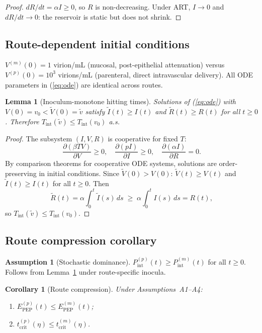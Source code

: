 \documentclass[11pt]{article}
\newtheorem{lemma}{Lemma}[section]
\newtheorem{corollary}{Corollary}[section]
\theoremstyle{definition}
\newtheorem{assumption}{Assumption}[section]
\theoremstyle{remark}
\newcommand{\Tint}{T_{\text{int}}}
\newcommand{\Pint}{P_{\text{int}}}
\newcommand{\Epep}{E_{\text{PEP}}}
\newcommand{\tcrit}{t_{\text{crit}}}
\begin{document}
\begin{proof}
$dR/dt = \alpha I \geq 0$, so $R$ is non-decreasing. Under ART, $I \to 0$ and $dR/dt \to 0$: the reservoir is static but does not shrink.
\end{proof}

\subsection{Route-dependent initial conditions}

$V^{(m)}(0) = 1$ virion/mL (mucosal, post-epithelial attenuation) versus $V^{(p)}(0) = 10^{3}$ virions/mL (parenteral, direct intravascular delivery). All ODE parameters in (\ref{eq:ode}) are identical across routes.

\begin{lemma}[Inoculum-monotone hitting times]\label{lem:monotone}
Solutions of (\ref{eq:ode}) with $V(0) = v_{0} < \tilde{V}(0) = \tilde{v}$ satisfy $\tilde{I}(t) \geq I(t)$ and $\tilde{R}(t) \geq R(t)$ for all $t \geq 0$. Therefore $\Tint(\tilde{v}) \leq \Tint(v_{0})$ a.s.
\end{lemma}

\begin{proof}
The subsystem $(I, V, R)$ is cooperative for fixed $T$:
\[
\frac{\partial(\beta TV)}{\partial V} \geq 0, \quad
\frac{\partial(pI)}{\partial I} \geq 0, \quad
\frac{\partial(\alpha I)}{\partial R} = 0.
\]
By comparison theorems for cooperative ODE systems\cite{smith1995}, solutions are order-preserving in initial conditions. Since $\tilde{V}(0) > V(0)$: $\tilde{V}(t) \geq V(t)$ and $\tilde{I}(t) \geq I(t)$ for all $t \geq 0$. Then
\[
\tilde{R}(t) = \alpha \int_{0}^{t} \tilde{I}(s)\,ds \;\geq\; \alpha \int_{0}^{t} I(s)\,ds = R(t),
\]
so $\Tint(\tilde{v}) \leq \Tint(v_{0})$.
\end{proof}

\subsection{Route compression corollary}

\begin{assumption}[Stochastic dominance]
$\Pint^{(p)}(t) \geq \Pint^{(m)}(t)$ for all $t \geq 0$. Follows from Lemma~\ref{lem:monotone} under route-specific inocula.
\end{assumption}

\begin{corollary}[Route compression]\label{cor:route}
Under Assumptions~A1--A4:
\begin{enumerate}[label=\textnormal{(\roman*)},leftmargin=2.5em]
    \item $\Epep^{(p)}(t) \leq \Epep^{(m)}(t)$;
    \item $\tcrit^{(p)}(\eta) \leq \tcrit^{(m)}(\eta)$.
\end{enumerate}
\end{corollary}
\end{document}
